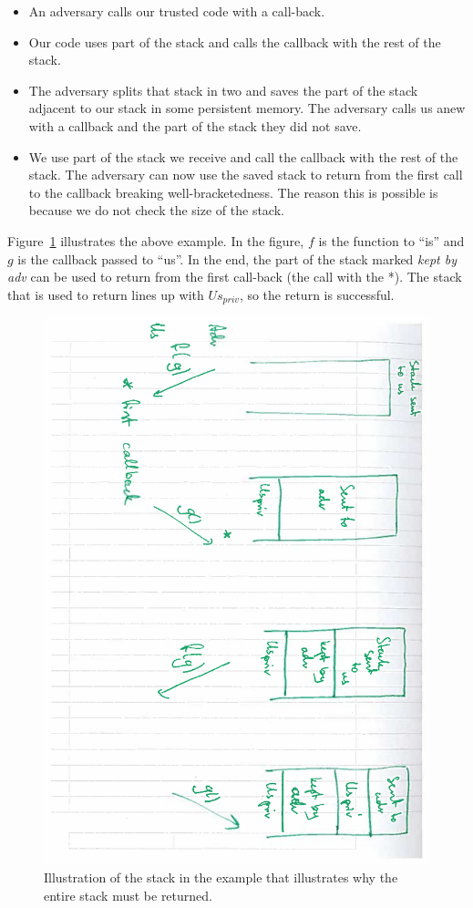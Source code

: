 \documentclass[a3paper]{article}
\newcommand{\var}[1]{\mathit{#1}}
\newcommand{\priv}{\var{priv}}
\begin{document}
\begin{itemize}
\item An adversary calls our trusted code with a call-back. 
\item Our code uses part of the stack and calls the callback with the rest of the stack.
\item The adversary splits that stack in two and saves the part of the stack adjacent to our stack in some persistent memory. The adversary calls us anew with a callback and the part of the stack they did not save. 
\item We use part of the stack we receive and call the callback with the rest of the stack. The adversary can now use the saved stack to return from the first call to the callback breaking well-bracketedness. The reason this is possible is because we do not check the size of the stack.
\end{itemize}
Figure~\ref{fig:ret-full-stk} illustrates the above example. In the figure, $f$ is the function to ``is'' and $g$ is the callback passed to ``us''. In the end, the part of the stack marked \emph{kept by adv} can be used to return from the first call-back (the call with the *). The stack that is used to return lines up with $\var{Us}_\priv$, so the return is successful.
\begin{figure}
  \centering
  \includegraphics[angle=90,width=\textwidth]{img/ret-full-stk.pdf}
  \caption{Illustration of the stack in the example that illustrates why the entire stack must be returned.}
  \label{fig:ret-full-stk}
\end{figure}
\end{document}
